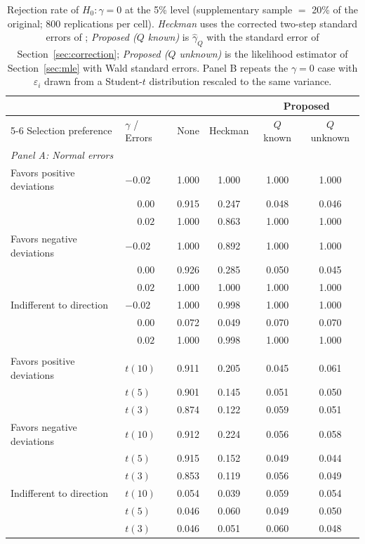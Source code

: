 \begin{table}[t]
\centering
\caption{Rejection rate of $H_0:\gamma=0$ at the 5\% level (supplementary sample $=$ 20\% of the original; 800 replications per cell). \emph{Heckman} uses the corrected two-step standard errors of \citet{Heckman79}; \emph{Proposed ($Q$ known)} is $\hat\gamma_Q$ with the standard error of Section~\ref{sec:correction}; \emph{Proposed ($Q$ unknown)} is the likelihood estimator of Section~\ref{sec:mle} with Wald standard errors. Panel B repeats the $\gamma=0$ case with $\varepsilon_i$ drawn from a Student-$t$ distribution rescaled to the same variance.}
\label{tab:reject}
\begin{tabular}{llcccc}
\toprule
& & & & \multicolumn{2}{c}{Proposed} \\ \cmidrule(lr){5-6}
Selection preference & $\gamma$ / Errors & None & Heckman & $Q$ known & $Q$ unknown \\
\midrule
\multicolumn{6}{l}{\emph{Panel A: Normal errors}} \\
Favors positive deviations & $-0.02$ & 1.000 & 1.000 & 1.000 & 1.000 \\
                           & $\phantom{-}0.00$ & 0.915 & 0.247 & 0.048 & 0.046 \\
                           & $\phantom{-}0.02$ & 1.000 & 0.863 & 1.000 & 1.000 \\
Favors negative deviations & $-0.02$ & 1.000 & 0.892 & 1.000 & 1.000 \\
                           & $\phantom{-}0.00$ & 0.926 & 0.285 & 0.050 & 0.045 \\
                           & $\phantom{-}0.02$ & 1.000 & 1.000 & 1.000 & 1.000 \\
Indifferent to direction   & $-0.02$ & 1.000 & 0.998 & 1.000 & 1.000 \\
                           & $\phantom{-}0.00$ & 0.072 & 0.049 & 0.070 & 0.070 \\
                           & $\phantom{-}0.02$ & 1.000 & 0.998 & 1.000 & 1.000 \\
\addlinespace
\multicolumn{6}{l}{\emph{Panel B: fat-tailed errors, $\gamma=0$}} \\
Favors positive deviations & $t(10)$ & 0.911 & 0.205 & 0.045 & 0.061 \\
                           & $t(5)$ & 0.901 & 0.145 & 0.051 & 0.050 \\
                           & $t(3)$ & 0.874 & 0.122 & 0.059 & 0.051 \\
Favors negative deviations & $t(10)$ & 0.912 & 0.224 & 0.056 & 0.058 \\
                           & $t(5)$ & 0.915 & 0.152 & 0.049 & 0.044 \\
                           & $t(3)$ & 0.853 & 0.119 & 0.056 & 0.049 \\
Indifferent to direction   & $t(10)$ & 0.054 & 0.039 & 0.059 & 0.054 \\
                           & $t(5)$ & 0.046 & 0.060 & 0.049 & 0.050 \\
                           & $t(3)$ & 0.046 & 0.051 & 0.060 & 0.048 \\
\bottomrule
\end{tabular}
\end{table}
